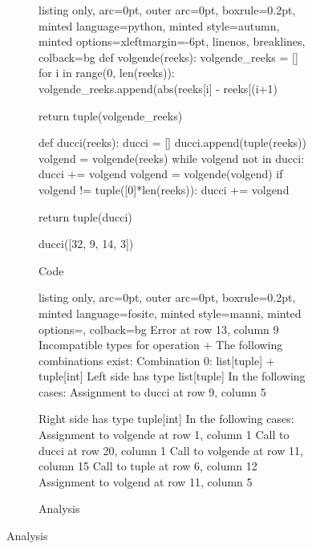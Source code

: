 
\begin{figure}[H]
\caption{Submision 4}
\label{sbm:sub4}
  \begin{subfigure}{\textwidth}
        \caption{Code}
        \label{sbm:sub4_code}

  \begin{tcblisting}{listing only, 
    arc=0pt,
    outer arc=0pt, 
    boxrule=0.2pt,
    minted language=python,
    minted style=autumn,
    minted options={xleftmargin=-6pt, linenos, breaklines},
    colback=bg }
def volgende(reeks):
    volgende_reeks = []
    for i in range(0, len(reeks)):
        volgende_reeks.append(abs(reeks[i] - reeks[(i+1)%
    
    return tuple(volgende_reeks)

def ducci(reeks):
    ducci = []
    ducci.append(tuple(reeks))
    volgend = volgende(reeks)
    while volgend not in ducci:
        ducci += volgend
        volgend = volgende(volgend)
    if volgend != tuple([0]*len(reeks)):
        ducci += volgend
        
    return tuple(ducci)

ducci([32, 9, 14, 3])
\end{tcblisting}
\end{subfigure}
\begin{subfigure}{\textwidth}
        \caption{Analysis}
        \label{sbm:sub4_anal}
\begin{tcblisting}{listing only, 
    arc=0pt,
    outer arc=0pt, 
    boxrule=0.2pt,
    minted language=fosite,
    minted style=manni,
    minted options={},
    colback=bg }
Error at row 13, column 9
  Incompatible types for operation +
  The following combinations exist:
  Combination 0: list[tuple] + tuple[int]
    Left side has type list[tuple]
    In the following cases:
      Assignment to ducci at row 9, column 5

    Right side has type tuple[int]
    In the following cases:
      Assignment to volgende at row 1, column 1
      Call to ducci at row 20, column 1
      Call to volgende at row 11, column 15
      Call to tuple at row 6, column 12
      Assignment to volgend at row 11, column 5
\end{tcblisting}
\end{subfigure}
\end{figure}
